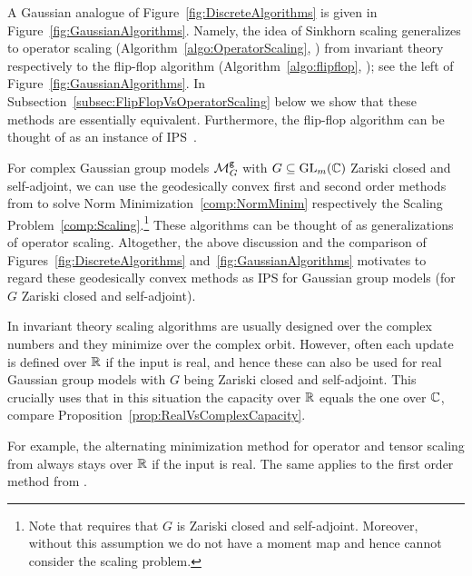 A Gaussian analogue of Figure~\ref{fig:DiscreteAlgorithms} is given in Figure~\ref{fig:GaussianAlgorithms}. Namely, the idea of Sinkhorn scaling generalizes to operator scaling (Algorithm~\ref{algo:OperatorScaling}, \cite{gurvits2004classical, garg2016deterministic}) from invariant theory respectively to the flip-flop algorithm (Algorithm~\ref{algo:flipflop}, \cite{dutilleul1999mle, lu2005likelihood}); see the left of Figure~\ref{fig:GaussianAlgorithms}. In Subsection~\ref{subsec:FlipFlopVsOperatorScaling} below we show that these methods are essentially equivalent. Furthermore, the flip-flop algorithm can be thought of as an instance of IPS~\cite{IPFienberg,GaussianIPF}.

For complex Gaussian group models $\mathcal{M}^{\mathtt{g}}_G$ with $G \subseteq \operatorname{GL}_m(\mathbb C)$ Zariski closed and self-adjoint, we can use the geodesically convex first and second order methods from \cite{GradflowArXiv} to solve Norm Minimization~\ref{comp:NormMinim} respectively the Scaling Problem~\ref{comp:Scaling}.\footnote{Note that \cite{GradflowArXiv} requires that $G$ is Zariski closed and self-adjoint. Moreover, without this assumption we do not have a moment map and hence cannot consider the scaling problem.}
These algorithms can be thought of as generalizations of operator scaling. Altogether, the above discussion and the comparison of Figures~\ref{fig:DiscreteAlgorithms} and~\ref{fig:GaussianAlgorithms} motivates to regard these geodesically convex methods as IPS for Gaussian group models (for $G$ Zariski closed and self-adjoint).


\begin{remark} \label{rem:GradflowForMLestimation}
	 In invariant theory scaling algorithms are usually designed over the complex numbers and they minimize over the complex orbit. However, often each update is defined over $\mathbb R$ if the input is real, and hence these can also be used for real Gaussian group models with $G$ being Zariski closed and self-adjoint. This crucially uses that in this situation the capacity over $\mathbb R$ equals the one over $\mathbb C$, compare Proposition~\ref{prop:RealVsComplexCapacity}.
	 
	 For example, the alternating minimization method for operator and tensor scaling from \cite{burgisser2017alternating} always stays over $\mathbb R$ if the input is real. The same applies to the first order method from \cite{GradflowArXiv}.
	 \hfill\remSymbol
\end{remark}

